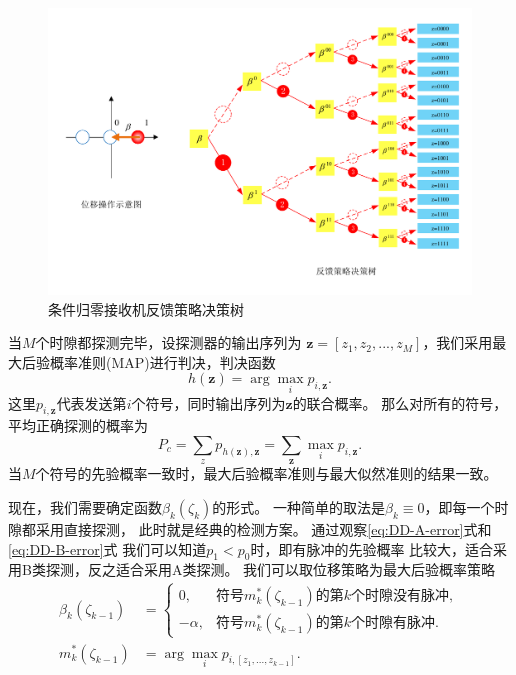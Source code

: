 \begin{figure}
\centering
  \includegraphics[width=\textwidth]{figures/chap4/CPN-strategy}
  \caption{条件归零接收机反馈策略决策树}
  \label{fig:CPN-strategy}
\end{figure}


当$M$个时隙都探测完毕，设探测器的输出序列为
$\bm{z}=[z_1,z_2,...,z_M]$，我们采用最大后验概率准则(MAP)进行判决，判决函数
\begin{equation}
h(\bm{z}) = \arg\max_i p_{i,\bm{z}}.
\end{equation}
这里$p_{i,\bm{z}}$代表发送第$i$个符号，同时输出序列为$\bm{z}$的联合概率。
那么对所有的符号，平均正确探测的概率为
\begin{equation}
P_c = \sum_z p_{h(\bm{z}),\bm{z}} = \sum_{\bm{z}} \max_i p_{i,\bm{z}}.
\end{equation}
当$M$个符号的先验概率一致时，最大后验概率准则与最大似然准则的结果一致。

现在，我们需要确定函数$\beta_k(\zeta_k)$的形式。
一种简单的取法是$\beta_k \equiv 0$，即每一个时隙都采用直接探测，
此时就是经典的检测方案。
通过观察\ref{eq:DD-A-error}式和\ref{eq:DD-B-error}式
我们可以知道$p_1 < p_0$时，即有脉冲的先验概率
比较大，适合采用B类探测，反之适合采用A类探测。
我们可以取位移策略为最大后验概率策略
\begin{equation}
\begin{split}
\beta_k(\zeta_{k-1}) &= \begin{cases}
                                0, & \text{符号} m_k^*(\zeta_{k-1}) \text{的第} k \text{个时隙没有脉冲}, \\
                                -\alpha, & \text{符号} m_k^*(\zeta_{k-1}) \text{的第} k \text{个时隙有脉冲}.
                             \end{cases} \\
m_k^*(\zeta_{k-1}) &=\arg\max_i p_{i,[z_1,...,z_{k-1}]}.   
\end{split}                          
\end{equation}

